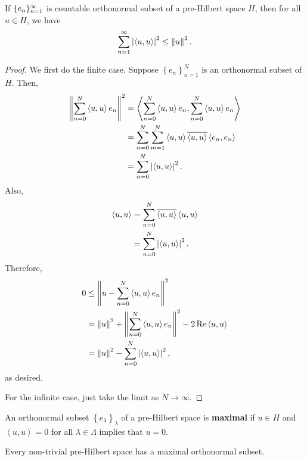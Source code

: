 \documentclass[a4paper]{article}
\renewcommand{\braket}[2]{\left\langle #1, #1 \right\rangle}
\begin{document}
\begin{thm}[Bessel]
  If $\{ e_n \}_{n=1}^\infty$ is countable orthonormal subset
  of a pre-Hilbert space $H$, then for all
  $u \in H$, we have
  \[
    \suminfn \abs{\braket{u}{e_n}}^2 \leq \norm{u}^2.
  \]
\end{thm}

\begin{proof}
  We first do the finite case. Suppose $\left\{ e_n \right\}
    _{n=1}^N$ is an orthonormal subset of $H$. Then,
  \[
    \begin{aligned}
      \norm{\sum_{n=0}^N \braket{u}{e_n} e_n}^2
       & = \braket{\sum_{n=0}^N \braket{u}{e_n} e_n }{\sum_{n=0}^N \braket{u}{e_n} e_n} \\
       & = \sum_{n=0}^N
      \sum_{m=1}^N \braket{u}{e_n} \bar{\braket{u}{e_m}} \braket{e_n}{e_m}              \\
       & = \sum_{n=0}^N \abs{\braket{u}{e_n}}^2.
    \end{aligned}
  \]
  Also,
  \[
    \begin{aligned}
      \braket{u}{\sum_{n=0}^N \braket{u}{e_n}e_n}
       & = \sum_{n=0}^N \bar{\braket{u}{e_n}} \braket{u}{e_n} \\
       & = \sum_{n=0}^N \abs{\braket{u}{e_n}}^2.
    \end{aligned}
  \]
  Therefore,
  \[
    \begin{aligned}
      0
       & \leq \norm{u - \sum_{n=0}^N \braket{u}{e_n}e_n}^2       \\
       & = \norm{u}^2 + \norm{\sum_{n=0}^N \braket{u}{e_n}e_n}^2
      - 2 \Re \braket{u}{\sum_{n=0}^N \braket{u}{e_n}e_n}        \\
       & = \norm{u}^2 - \sum_{n=0}^N \abs{\braket{u}{e_n}}^2,
    \end{aligned}
  \]
  as desired.

  For the infinite case, just take the limit as
  $N \to \infty$.
\end{proof}

\begin{defi}
  An orthonormal subset $\left\{ e_\lambda \right\}_\lambda$
  of a pre-Hilbert space is \textbf{maximal} if $u \in H$
  and $\braket{u}{e_\lambda} = 0$ for all $\lambda \in \Lambda$
  implies that $u = 0$.
\end{defi}

\begin{thm}
  Every non-trivial pre-Hilbert space has a maximal
  orthonormal subset.
\end{thm}
\end{document}

